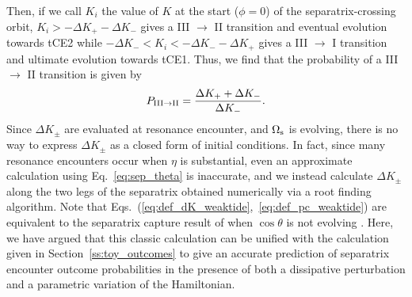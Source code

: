 \documentclass[
        fleqn,
        usenatbib,
    ]{mnras}
\begin{document}
Then, if we call $K_i$ the value of $K$ at the start ($\phi = 0$) of the
separatrix-crossing orbit, $K_i > -\Delta K_+ - \Delta K_-$ gives a III
$\to$ II transition and eventual evolution towards tCE2 while $-\Delta K_- < K_i
< -\Delta K_- - \Delta K_+$ gives a III $\to$ I transition and ultimate
evolution towards tCE1. Thus, we find that the probability of a III $\to$ II
transition is given by
\begin{equation}
    P_{\rm III \to II} = \frac{\Delta K_+ + \Delta K_-}{\Delta
        K_-}.\label{eq:def_pc_weaktide}
\end{equation}
Since $\Delta K_{\pm}$ are evaluated at resonance encounter, and
$\Omega_{\rm s}$ is evolving, there is no way to express $\Delta K_{\pm}$ as a
closed form of initial conditions. In fact, since many resonance encounters
occur when $\eta$ is substantial, even an approximate calculation using
Eq.~\eqref{eq:sep_theta} is inaccurate, and we instead calculate $\Delta
K_{\pm}$ along the two legs of the separatrix obtained numerically via a root
finding algorithm. Note that Eqs.~(\ref{eq:def_dK_weaktide},~\ref{eq:def_pc_weaktide}) are
equivalent to the separatrix capture result of \citet{henrard1982} when $\cos
\theta$ is not evolving \citep{henrard1987}. Here, we have argued that this
classic calculation can be unified with the calculation given in
Section~\ref{ss:toy_outcomes} to give an accurate prediction of separatrix
encounter outcome probabilities in the presence of both a dissipative
perturbation and a parametric variation of the Hamiltonian.
\end{document}
